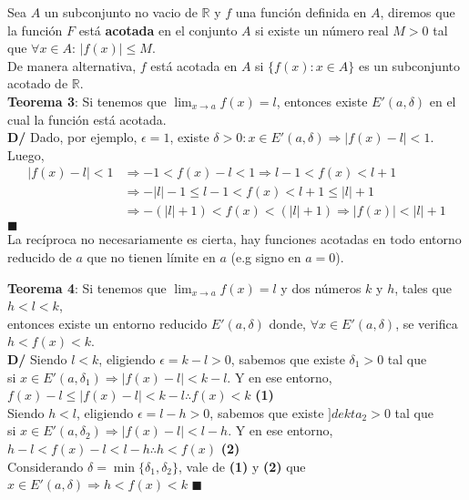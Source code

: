 \documentclass[11pt,a4paper]{article}
\newcommand*{\QEDA}{\null\nobreak\hfill\ensuremath{\blacksquare}}
\begin{document}
\noindent Sea $A$ un subconjunto no vacio de $\mathbb{R}$ y $f$ una funci\'on definida en $A$, diremos que la funci\'on $F$ est\'a \textbf{acotada} en el conjunto $A$ si existe un n\'umero real $M > 0$ tal que $\forall x \in A$: $|f(x)| \leq M$.\\
\noindent De manera alternativa, $f$ est\'a acotada en $A$ si $\{f(x):x\in A\}$ es un subconjunto acotado de $\mathbb{R}$.\\

\noindent \textbf{Teorema 3}: Si tenemos que $\displaystyle{\lim_{x\to a}f(x) = l}$, entonces existe $E'(a,\delta)$ en el cual la funci\'on est\'a acotada.\\
\noindent \textbf{D/} Dado, por ejemplo, $\epsilon=1$, existe $\delta>0 : x\in E'(a,\delta) \Rightarrow |f(x)-l|<1$. Luego, 
\begin{align*}
|f(x)-l| < 1 & \Rightarrow -1 < f(x)-l < 1 \Rightarrow l-1<f(x)<l+1\\
& \Rightarrow -|l|-1 \leq l-1<f(x)<l+1\leq|l|+1\\
& \Rightarrow -(|l|+1) < f(x) < (|l|+1) \Rightarrow |f(x)|<|l|+1
\end{align*}
\QEDA\\

La rec\'iproca no necesariamente es cierta, hay funciones acotadas en todo entorno reducido de $a$ que no tienen l\'imite en $a$ (e.g signo en $a=0$).

\newpage

\noindent \textbf{Teorema 4}: Si tenemos que $\displaystyle{\lim_{x\to a}f(x) = l}$ y dos n\'umeros $k$ y $h$, tales que $h<l<k$,\\
entonces existe un entorno reducido $E'(a,\delta)$ donde, $\forall x \in E'(a,\delta)$, se verifica $h < f(x) < k$.\\
\textbf{D/} Siendo $l < k$, eligiendo $\epsilon = k - l > 0$, sabemos que existe $\delta_1 > 0$ tal que\\ si $x\in E'(a,\delta_1) \Rightarrow |f(x)-l|<k-l$. Y en ese entorno, $f(x)-l \leq |f(x)-l| < k-l \therefore f(x) < k$ \hfill \textbf{(1)}\\
Siendo $h < l$, eligiendo $\epsilon = l - h > 0$, sabemos que existe $]dekta_2 > 0$ tal que\\ si $x\in E'(a,\delta_2) \Rightarrow |f(x)-l|<l-h$. Y en ese entorno, $h-l<f(x)-l<l-h \therefore h<f(x)$ \hfill \textbf{(2)}\\
Considerando $\delta=\min\{\delta_1,\delta_2\}$, vale de \textbf{(1)} y \textbf{(2)} que $x\in E'(a,\delta) \Rightarrow h < f(x) < k$
\QEDA\\
\end{document}
